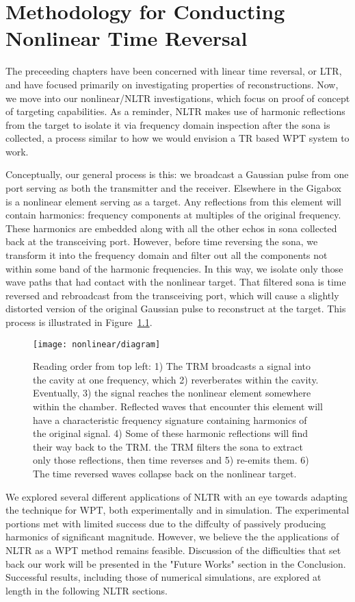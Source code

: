 \chapter{Methodology for Conducting Nonlinear Time Reversal}
\label{ch:nonlinear-meth}

The preceeding chapters have been concerned with linear time reversal, or LTR, and have focused primarily on investigating properties of reconstructions. Now, we move into our nonlinear/NLTR investigations, which focus on proof of concept of targeting capabilities. As a reminder, NLTR makes use of harmonic reflections from the target to isolate it via frequency domain inspection after the sona is collected, a process similar to how we would envision a TR based WPT system to work. 

Conceptually, our general process is this: we broadcast a Gaussian pulse from one port serving as both the transmitter and the receiver. Elsewhere in the Gigabox is a nonlinear element serving as a target. Any reflections from this element will contain harmonics: frequency components at multiples of the original frequency. These harmonics are embedded along with all the other echos in sona collected back at the transceiving port. However, before time reversing the sona, we transform it into the frequency domain and filter out all the components not within some band of the harmonic frequencies. In this way, we isolate only those wave paths that had contact with the nonlinear target. That filtered sona is time reversed and rebroadcast from the transceiving port, which will cause a slightly distorted version of the original Gaussian pulse to reconstruct at the target. This process is illustrated in Figure~\ref{fig:nonlinear-diagram}.

\begin{figure}[h!]
\centering
\texttt{[image: nonlinear/diagram]}
    \caption[Conceptual overview of nonlinear time reversal]{Reading order from top left: 1) The TRM broadcasts a signal into the cavity at one frequency, which 2) reverberates within the cavity. Eventually, 3) the signal reaches the nonlinear element somewhere within the chamber. Reflected waves that encounter this element will have a characteristic frequency signature containing harmonics of the original signal. 4) Some of these harmonic reflections will find their way back to the TRM. the TRM filters the sona to extract only those reflections, then time reverses and 5) re-emits them. 6) The time reversed waves collapse back on the nonlinear target.}
    \label{fig:nonlinear-diagram}
\end{figure}

We explored several different applications of NLTR with an eye towards adapting the technique for WPT, both experimentally and in simulation. The experimental portions met with limited success due to the diffculty of passively producing harmonics of significant magnitude. However, we believe the the applications of NLTR as a WPT method remains feasible. Discussion of the difficulties that set back our work will be presented in the "Future Works" section in the Conclusion. Successful results, including those of numerical simulations, are explored at length in the following NLTR sections. 
